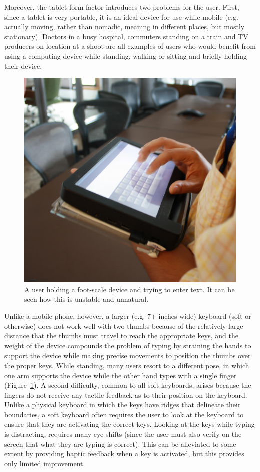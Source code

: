 Moreover, the tablet form-factor introduces two problems for the user.
First, since a tablet is very portable, it is an ideal device for use
while mobile (e.g. actually moving, rather than nomadic, meaning in
different places, but mostly stationary).  Doctors in a busy hospital,
commuters standing on a train and TV producers on location at a shoot
are all examples of users who would benefit from using a computing
device while standing, walking or sitting and briefly holding their
device.
\begin{figure}
    \includegraphics[scale=0.35]{Figures/device_hold.pdf} 
  	\caption{A user holding a foot-scale device and trying to enter text. It can be seen how this is unstable and unnatural.}
    \label{fig:device_hold}
\end{figure}
Unlike a mobile phone, however, a larger (e.g. 7+ inches wide)
keyboard (soft or otherwise) does not work well with two thumbs
because of the relatively large distance that the thumbs must travel
to reach the appropriate keys, and the weight of the device compounds
the problem of typing by straining the hands to support the device
while making precise movements to position the thumbs over the proper
keys. While standing, many users resort to a different pose, in which
one arm supports the device while the other hand types with a single
finger (Figure~\ref{fig:device_hold}). A second difficulty, common to all soft keyboards, arises because the
fingers do not receive any tactile feedback as to their position on
the keyboard.  Unlike a physical keyboard in which the keys have
ridges that delineate their boundaries, a soft keyboard often requires
the user to look at the keyboard to ensure that they are activating
the correct keys.  Looking at the keys while typing is distracting,
requires many eye shifts (since the user must also verify on the
screen that what they are typing is correct).  This can be alleviated
to some extent by providing haptic feedback when a key is activated,
but this provides only limited improvement.

